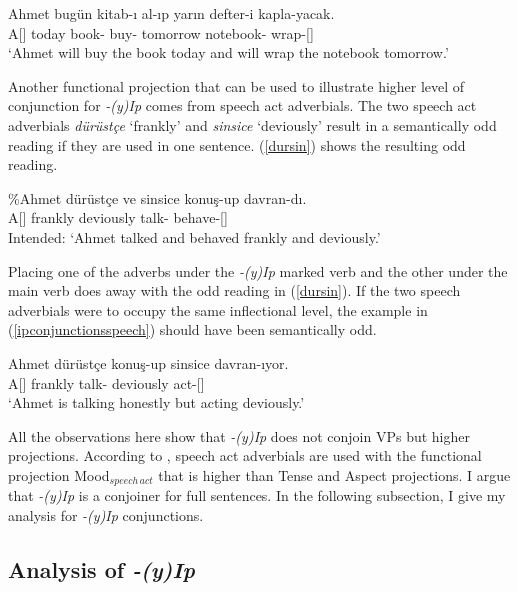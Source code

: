 \begin{exe}
\ex \label{ipconjunctionstime}
\gll Ahmet bugün kitab-ı al-ıp yarın defter-i kapla-yacak. \\
A[{\Nom}] today book-{\Acc} buy-{\Pc} tomorrow notebook-{\Acc} wrap-{\Fut}[{\Tsg}] \\
\glt `Ahmet will buy the book today and will wrap the notebook tomorrow.'
\end{exe}

Another functional projection that can be used to illustrate higher level of conjunction for \textit{-(y)Ip} comes from speech act adverbials. The two speech act adverbials \textit{dürüstçe} `frankly' and \textit{sinsice} `deviously' result in a semantically odd reading if they are used in one sentence. (\ref{dursin}) shows the resulting odd reading.

\begin{exe}
\ex \label{dursin} 
\gll \%Ahmet dürüstçe ve sinsice konuş-up davran-dı. \\ 
A[{\Nom}] frankly {\And} deviously talk-{\Pc} behave-{\Pst}[{\Tsg}] \\
\glt Intended: `Ahmet talked and behaved frankly and deviously.'
\end{exe}

Placing one of the adverbs under the \textit{-(y)Ip} marked verb and the other under the main verb does away with the odd reading in (\ref{dursin}). If the two speech adverbials were to occupy the same inflectional level, the example in (\ref{ipconjunctionsspeech}) should have been semantically odd.

\begin{exe}
\ex \label{ipconjunctionsspeech}
\gll Ahmet dürüstçe konuş-up sinsice davran-ıyor. \\
A[{\Nom}] frankly talk-{\Pc} deviously act-{\Prog}[{\Tsg}] \\
\glt `Ahmet is talking honestly but acting deviously.'
\end{exe}

All the observations here show that \textit{-(y)Ip} does not conjoin VPs but higher projections. According to \citet{cinque1999adverbs}, speech act adverbials are used with the functional projection Mood$_{speech\,act}$ that is higher than Tense and Aspect projections. I argue that \textit{-(y)Ip} is a conjoiner for full sentences. In the following subsection, I give my analysis for \textit{-(y)Ip} conjunctions.


\subsection{Analysis of \textit{-(y)Ip}}

